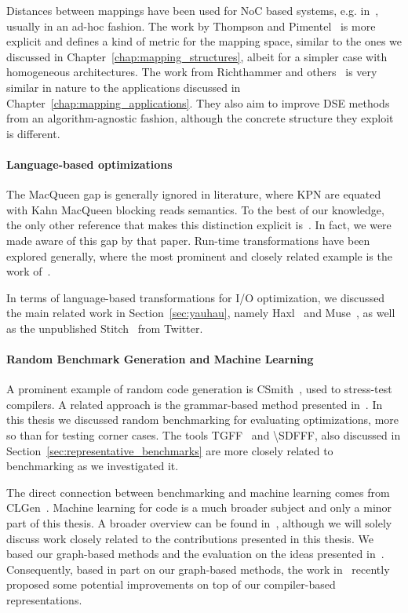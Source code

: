 Distances between mappings have been used for \ac{NoC} based systems, e.g. in~\cite{singh2010communication,weichslgartner2014daarm}, usually in an ad-hoc fashion.
The work by Thompson and Pimentel~\cite{thompson2013exploiting} is more explicit and defines a kind of metric for the mapping space, similar to the ones we discussed in Chapter~\ref{chap:mapping_structures}, albeit for a simpler case with homogeneous architectures.
The work from Richthammer and others~\cite{richthammer2018search,richthammer_todaes20} is very similar in nature to the applications discussed in Chapter~\ref{chap:mapping_applications}.
They also aim to improve \ac{DSE} methods from an algorithm-agnostic fashion, although the concrete structure they exploit is different.

\paragraph{Language-based optimizations} 
The MacQueen gap is generally ignored in literature, where \ac{KPN} are equated with Kahn MacQueen blocking reads semantics. 
To the best of our knowledge, the only other reference that makes this distinction explicit is~\cite{lee_matsikoudis_semantics}.
In fact, we were made aware of this gap by that paper.
Run-time transformations have been explored generally, where the most prominent and closely related example is the work of~\cite{schor2014adapnet}.

In terms of language-based transformations for \ac{I/O} optimization, we discussed the main related work in Section~\ref{sec:yauhau}, namely Haxl~\cite{marlow2014haxl} and Muse~\cite{muse},
as well as the unpublished Stitch~\cite{stitch} from Twitter.

\paragraph{Random Benchmark Generation and Machine Learning}
A prominent example of random code generation is CSmith~\cite{csmith}, used to stress-test compilers.
A related approach is the grammar-based method presented in~\cite{mckenzie1997generating}.
In this thesis we discussed random benchmarking for evaluating optimizations, more so than for testing corner cases.
The tools \ac{TGFF}~\cite{dick1998tgff} and \ac{\SDFFF}\cite{sdf3}, also discussed in Section~\ref{sec:representative_benchmarks} are more closely related to benchmarking as we investigated it.

The direct connection between benchmarking and machine learning comes from CLGen~\cite{cummins_cgo17}.
Machine learning for code is a much broader subject and only a minor part of this thesis.
A broader overview can be found in~\cite{allamanis2018survey}, although we will solely discuss work closely related to the contributions presented in this thesis. 
We based our graph-based methods and the evaluation on the ideas presented in~\cite{cummins_pact17,inst2vec}.
Consequently, based in part on our graph-based methods, the work in~\cite{cummins_programl,ye2020deep} recently proposed some potential improvements on top of our compiler-based representations.